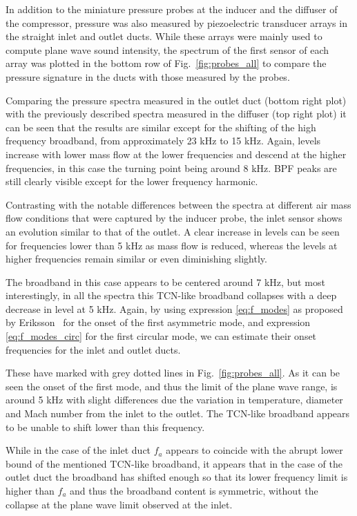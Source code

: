 In addition to the miniature pressure probes at the inducer and the diffuser of the compressor, pressure was also measured by piezoelectric transducer arrays in the straight inlet and outlet ducts. While these arrays were mainly used to compute plane wave sound intensity, the spectrum of the first sensor of each array was plotted in the bottom row of Fig.~\ref{fig:probes_all} to compare the pressure signature in the ducts with those measured by the  probes.

Comparing the pressure spectra measured in the outlet duct (bottom right plot) with the previously described spectra measured in the diffuser (top right plot) it can be seen that the results are similar except for the shifting of the high frequency broadband, from approximately 23 kHz to 15 kHz. Again, levels increase with lower mass flow at the lower frequencies and descend at the higher frequencies, in this case the turning point being around 8 kHz. BPF peaks are still clearly visible except for the lower frequency harmonic.

Contrasting with the notable differences between the spectra at different air mass flow conditions that were captured by the inducer probe, the inlet sensor shows an evolution similar to that of the outlet. A clear increase in levels can be seen for frequencies lower than 5 kHz as mass flow is reduced, whereas the levels at higher frequencies remain similar or even diminishing slightly.

The broadband in this case appears to be centered around 7 kHz, but most interestingly, in all the spectra this TCN-like broadband collapses with a deep decrease in level at 5 kHz. Again, by using expression \ref{eq:f_modes} as proposed by Eriksson~\cite{eriksson1980higher} for the onset of the first asymmetric mode, and  expression \ref{eq:f_modes_circ} for the first circular mode, we can estimate their onset frequencies for the inlet and outlet ducts. 

These have marked with grey dotted lines in Fig.~\ref{fig:probes_all}. As it can be seen the onset of the first mode, and thus the limit of the plane wave range, is around 5 kHz with slight differences due the variation in temperature, diameter and Mach number from the inlet to the outlet. The TCN-like broadband appears to be unable to shift lower than this frequency.

While in the case of the inlet duct $f_a$ appears to coincide with the abrupt lower bound of the mentioned TCN-like broadband, it appears that in the case of the outlet duct the broadband has shifted enough so that its lower frequency limit is higher than $f_a$ and thus the broadband content is symmetric, without the collapse at the plane wave limit observed at the inlet.

